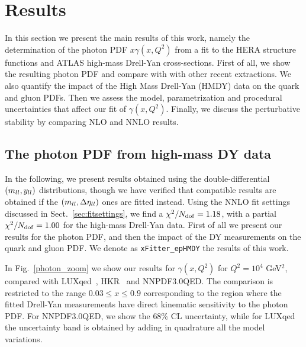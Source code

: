 \section{Results}
\label{sec:results}

In this section we present the main results of this work,
namely the determination
of the photon PDF $x\gamma(x,Q^2)$ from a fit to the HERA structure functions
and ATLAS high-mass Drell-Yan cross-sections.
%
First of all, we show the resulting photon PDF and compare with
with other recent extractions.
%
We also quantify the impact of the High Mass Drell-Yan (HMDY) data on the quark and
gluon PDFs.
%
Then we assess the model, parametrization
and procedural uncertainties that affect our fit of $\gamma(x,Q^2)$.
%
Finally, we discuss the perturbative stability by comparing
NLO and NNLO results.

\subsection{The photon PDF from high-mass DY data}

In the following, we  present results obtained using the
double-differential $\left( m_{ll},y_{ll}\right)$ distributions, though
we have verified that compatible results
are obtained if the $\left( m_{ll},\Delta\eta_{ll}\right)$ ones are fitted
instead.
%
Using the NNLO fit settings discussed in Sect.~\ref{sec:fitsettings}, we find
a $\chi^{2}/N_{\rm dof} = 1.18$,
with a partial $\chi^2/N_{\rm dof} = 1.00$ for the high-mass Drell-Yan data.
%
First of all we present our results for the photon PDF, and then the impact
of the DY measurements on the quark and gluon PDF.
%
We denote as {\tt xFitter\_epHMDY} the results of this work.

In Fig.~\ref{photon_zoom} we show our results
for $\gamma(x,Q^2)$ for $Q^2=10^4$ GeV$^2$,
compared with LUXqed~\cite{Manohar:2016nzj}, HKR~\cite{Harland-Lang:2016apc}
and NNPDF3.0QED.
%
The comparison is restricted to the range $0.03 \le x \le 0.9$ corresponding
to the region where the fitted Drell-Yan measurements have direct kinematic sensitivity
to the photon PDF.
%
For NNPDF3.0QED, we show the 68\% CL uncertainty, while for LUXqed the uncertainty band
is obtained by adding in quadrature all the model variations.

